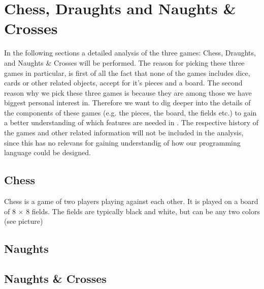 \section{Chess, Draughts and Naughts \& Crosses}

In the following sections a detailed analysis of the three games: Chess, Draughts, and Naughts \& Crosses will be performed. The reason for picking these three games in particular, is first of all the fact that none of the games includes dice, cards or other related objects, accept for it's pieces and a board. The second reason why we pick these three games is because they are among those we have biggest personal interest in. Therefore we want to dig deeper into the details of the components of these games (e.g. the pieces, the board, the fields etc.) to gain a better understanding of which features are needed in \productname. The respective history of the games and other related information will not be included in the analysis, since this has no relevans for gaining understandig of how our programming language could be designed.  

\subsection{Chess}
Chess is a game of two players playing against each other. It is played on a board of 8 $\times$ 8 fields. The fields are typically black and white, but can be any two colors (see picture) %


\subsection{Naughts}

\subsection{Naughts \& Crosses}       